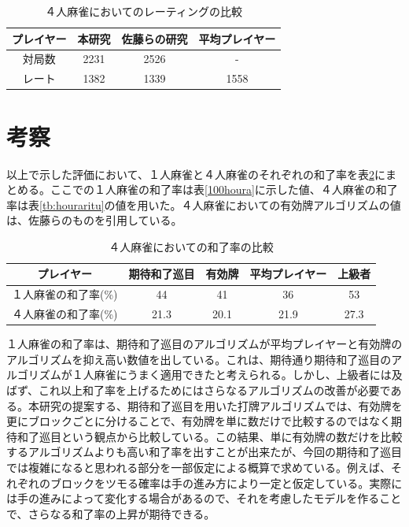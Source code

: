 \begin{table}[h]
  \caption{４人麻雀においてのレーティングの比較}
  \label{tb:rate2231}
  \begin{center}
  \begin{tabular}{c||c|c|c}
    \hline
    プレイヤー   & 本研究 & 佐藤らの研究 & 平均プレイヤー\\\hline\hline
    対局数   & 2231 & 2526 & - \\\hline
    レート & 1382 & 1339 & 1558\\\hline
  \end{tabular}\end{center}
\end{table}

\section{考察}

以上で示した評価において、１人麻雀と４人麻雀のそれぞれの和了率を表\ref{4houra}にまとめる。ここでの１人麻雀の和了率は表\ref{100houra}に示した値、４人麻雀の和了率は表\ref{tb:houraritu}の値を用いた。４人麻雀においての有効牌アルゴリズムの値は、佐藤らのものを引用している。

\begin{table}[h]
  \caption{４人麻雀においての和了率の比較}
  \label{4houra}
  \begin{center}
  \begin{tabular}{c||c|c|c|c}
    \hline
    プレイヤー  & 期待和了巡目 & 有効牌 & 平均プレイヤー & 上級者\\\hline\hline
    １人麻雀の和了率(\%) & 44 & 41 & 36 & 53\\\hline
    ４人麻雀の和了率(\%) & 21.3 & 20.1 & 21.9 & 27.3\\\hline
  \end{tabular}\end{center}
\end{table}

１人麻雀の和了率は、期待和了巡目のアルゴリズムが平均プレイヤーと有効牌のアルゴリズムを抑え高い数値を出している。これは、期待通り期待和了巡目のアルゴリズムが１人麻雀にうまく適用できたと考えられる。しかし、上級者には及ばず、これ以上和了率を上げるためにはさらなるアルゴリズムの改善が必要である。本研究の提案する、期待和了巡目を用いた打牌アルゴリズムでは、有効牌を更にブロックごとに分けることで、有効牌を単に数だけで比較するのではなく期待和了巡目という観点から比較している。この結果、単に有効牌の数だけを比較するアルゴリズムよりも高い和了率を出すことが出来たが、今回の期待和了巡目では複雑になると思われる部分を一部仮定による概算で求めている。例えば、それぞれのブロックをツモる確率は手の進み方により一定と仮定している。実際には手の進みによって変化する場合があるので、それを考慮したモデルを作ることで、さらなる和了率の上昇が期待できる。

